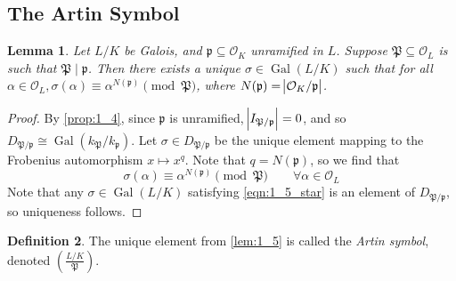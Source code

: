 \documentclass[11pt]{article}
\theoremstyle{definition}
\newtheorem{definition}{Definition}[section]
\theoremstyle{plain}
\newtheorem{lemma}[definition]{Lemma}
\theoremstyle{remark}
\DeclareMathOperator{\Gal}{Gal}
\newcommand{\cO}{\mathcal{O}}
\newcommand{\cp}{\mathfrak{P}}
\newcommand{\fp}{\mathfrak{p}}
\newcommand{\leg}[2]{\left(\frac{#1}{#2}\right)}
\begin{document}
\subsection{The Artin Symbol}

\begin{lemma}\label{lem:1_5}
    Let $L/K$ be Galois, and $\fp \subseteq \cO_K$ unramified in $L$. Suppose $\cp \subseteq \cO_L$ is such that $\cp \mid \fp$. Then there exists a unique $\sigma \in \Gal(L/K)$ such that for all $\alpha \in \cO_L, \sigma(\alpha) \equiv \alpha^{N(\fp)} \pmod{\cp}$, where $N(\fp) = \abs{\cO_K / \fp}$.
\end{lemma}
\begin{proof}
    By \autoref{prop:1_4}, since $\fp$ is unramified, $\abs{I_{\cp / \fp}} = 0$, and so $D_{\cp / \fp} \cong \Gal(k_\cp / k_\fp)$. Let $\sigma \in D_{\cp / \fp}$ be the unique element mapping to the Frobenius automorphism $x \mapsto x^q$. Note that $q = N(\fp)$, so we find that
    \begin{equation}\label{eqn:1_5_star}
        \sigma(\alpha) \equiv \alpha^{N(\fp)} \pmod{\cp} \qquad \forall \alpha \in \cO_L
    \end{equation}
    Note that any $\sigma \in \Gal(L/K)$ satisfying \eqref{eqn:1_5_star} is an element of $D_{\cp / \fp}$, so uniqueness follows.
\end{proof}

\begin{definition}\label{def:1_6}
    The unique element from \autoref{lem:1_5} is called the \emph{Artin symbol}, denoted $\leg{L/K}{\cp}$.
\end{definition}
\end{document}
